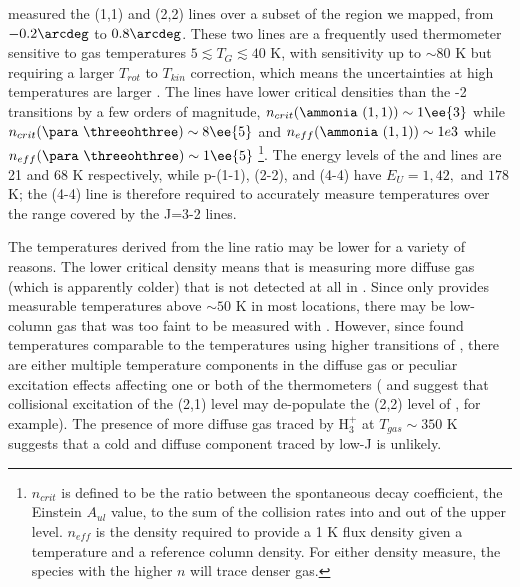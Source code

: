 \citet{Ott2014a} measured the \ammonia (1,1) and (2,2) lines over a subset of
the region we mapped, from $-0.2\arcdeg$ to $0.8\arcdeg$.  These two lines are
a frequently used thermometer sensitive to gas temperatures $5 \lesssim T_G
\lesssim 40$ K, with sensitivity up to $\sim80$ K but requiring a larger
$T_{rot}$ to $T_{kin}$ correction, which means the uncertainties at high
temperatures are larger \citep[][their Figure 1]{Mangum2013a}.  The \ammonia lines
have lower critical densities than the -2 transitions by a few
orders of magnitude, $n_{crit}(\textrm{\ammonia}~(1,1))\sim1\ee{3}$ \percc
while $n_{crit}(\para~ \threeohthree)\sim8\ee{5}$ \percc and
$n_{eff}(\textrm{\ammonia}~(1,1))\sim1e3$ while
$n_{eff}(\para~\threeohthree)\sim1\ee{5}$
\citep[][]{Shirley2015a}\footnote{$n_{crit}$ is defined to be the ratio between
the spontaneous decay coefficient, the Einstein $A_{ul}$ value, to the sum of
the collision rates into and out of the upper level.  $n_{eff}$ is the density
required to provide a 1 K \kms flux density given a temperature and a reference
column density.  For either density measure, the species with the higher $n$
will trace denser gas.}.  The energy levels of the
\threeohthree and \threetwoone lines are 21 and 68 K respectively, while
p-\ammonia (1-1), (2-2), and (4-4) have $E_U = 1, 42, $ and $178$ K; the (4-4)
line is therefore required to accurately measure temperatures over the range
covered by the \para J=3-2 lines.

The temperatures derived from the \ammonia line ratio may be lower for a
variety of reasons.  The lower critical density means that \ammonia is
measuring more diffuse gas (which is apparently colder) that is not detected at
all in \formaldehyde.  Since \formaldehyde only provides measurable
temperatures above $\sim50$ K in most locations, there may be low-column gas
that was too faint to be measured with \formaldehyde.  However, since
\citet{Guesten1981a} found temperatures comparable to the \formaldehyde
temperatures using higher transitions of \ammonia, there are either multiple
temperature components in the diffuse gas or peculiar excitation effects
affecting one or both of the thermometers (\citet{Guesten1981a} and
\citet{Morris1973a} suggest that collisional excitation of the (2,1) level may
de-populate the (2,2) level of \ammonia, for example).  The presence of more
diffuse gas traced by H$_3^+$ at $T_{gas}\sim350$ K \citep{Goto2011a,Goto2014a}
suggests that a cold and diffuse component traced by low-J \ammonia is
unlikely.


